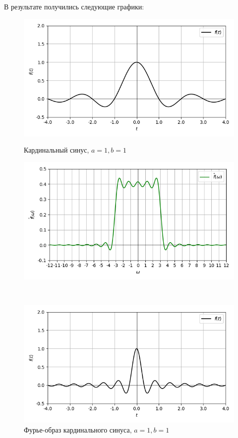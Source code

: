 \documentclass[a4paper]{article}
\begin{document}
В результате получились следующие графики:

\begin{figure}[H]
    \begin{minipage}{0.5\textwidth}
        \centering \includegraphics[width=\textwidth]{sinc/real_graph_1_1.png}
        \caption{Кардинальный синус, $a = 1, b = 1$}
    \end{minipage}\hfill
    \begin{minipage}{0.5\textwidth}
        \centering \includegraphics[width=\textwidth]{sinc/real_fourier_1_1.png}
        \caption{Фурье-образ кардинального синуса, $a = 1, b = 1$}
    \end{minipage}\\[1em]
        \begin{minipage}{0.5\textwidth}
        \centering \includegraphics[width=\textwidth]{sinc/real_graph_1_3.png}

\end{minipage}
\end{figure}
\end{document}
